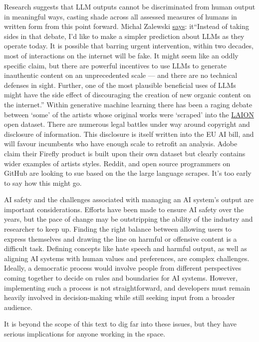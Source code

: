 Research suggests that LLM outputs cannot be discriminated from human output in meaningful ways, casting shade across all assessed measures of humans in written form \cite{sadasivan2023can} from this point forward. Michal Zalewski \href{https://lcamtuf.substack.com/p/llms-a-bleak-future-ahead}{says}: it{``Instead of taking sides in that debate, I’d like to make a simpler prediction about LLMs as they operate today. It is possible that barring urgent intervention, within two decades, most of interactions on the internet will be fake. It might seem like an oddly specific claim, but there are powerful incentives to use LLMs to generate inauthentic content on an unprecedented scale — and there are no technical defenses in sight. Further, one of the most plausible beneficial uses of LLMs might have the side effect of discouraging the creation of new organic content on the internet.''}
Within generative machine learning there has been a raging debate between `some' of the artists whose original works were `scraped' into the \href{https://laion.ai/}{LAION} open dataset. There are numerous legal battles under way around copyright and disclosure of information. This disclosure is itself written into the EU AI bill, and will favour incumbents who have enough scale to retrofit an analysis. Adobe claim their Firefly product is built upon their own dataset but clearly contains wider examples of artists styles. Reddit, and open source programmers on GitHub are looking to sue based on the the large language scrapes. It's too early to say how this might go.\par
AI safety and the challenges associated with managing an AI system's output are important considerations. Efforts have been made to ensure AI safety over the years, but the pace of change may be outstripping the ability of the industry and researcher to keep up. Finding the right balance between allowing users to express themselves and drawing the line on harmful or offensive content is a difficult task. Defining concepts like hate speech and harmful output, as well as aligning AI systems with human values and preferences, are complex challenges. Ideally, a democratic process would involve people from different perspectives coming together to decide on rules and boundaries for AI systems. However, implementing such a process is not straightforward, and developers must remain heavily involved in decision-making while still seeking input from a broader audience.\par
It is beyond the scope of this text to dig far into these issues, but they have serious implications for anyone working in the space. \par 

